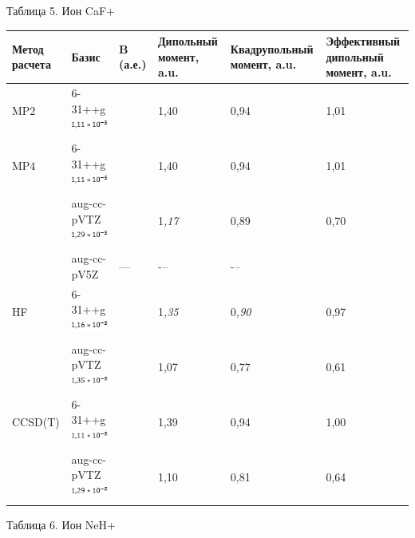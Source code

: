 \documentclass{article}
\begin{document}
\vspace{10pt}
\begin{center}
Таблица 5. Ион CaF+

\vspace{10pt}
\begin{tabular}{|>{\raggedright}p{31pt}|>{\raggedright}p{45pt}|>{\raggedright}p{40pt}|>{\raggedright}p{39pt}|>{\raggedright}p{52pt}|>{\raggedright}p{62pt}|}
\hline
М\textbf{етод расчета} & Б\textbf{азис} & B\textbf{ (а.е.)} & Д\textbf{ипольный 
момент, a.u.} & К\textbf{вадрупольный момент, a.u.} & Э\textbf{ффективный 
дипольный момент, a.u.}\tabularnewline
\hline
MP2 & 6-31++g
\includegraphics[width=54pt, height=15pt, keepaspectratio=true]{7-fig013.png}
 &  & 1,40 & 0,94 & 1,01\tabularnewline
\hline
MP4 & 6-31++g
\includegraphics[width=54pt, height=15pt, keepaspectratio=true]{7-fig014.png}
 &  & 1,40 & 0,94 & 1,01\tabularnewline
\hline
 & aug-cc-pVTZ
\includegraphics[width=54pt, height=15pt, keepaspectratio=true]{7-fig015.png}
 &  & 1\textit{,17} & 0,89 & 0,70\tabularnewline
\hline
 & aug-cc-pV5Z & --- & -\textit{--} & -\textit{--} & \tabularnewline
\hline
HF & 6-31++g
\includegraphics[width=54pt, height=15pt, keepaspectratio=true]{7-fig016.png}
 &  & 1\textit{,35} & 0\textit{,90} & 0,97\tabularnewline
\hline
 & aug-cc-pVTZ
\includegraphics[width=54pt, height=15pt, keepaspectratio=true]{7-fig017.png}
 &  & 1,07 & 0,77 & 0,61\tabularnewline
\hline
CCSD(T) & 6-31++g
\includegraphics[width=54pt, height=15pt, keepaspectratio=true]{7-fig018.png}
 &  & 1,39 & 0,94 & 1,00\tabularnewline
\hline
 & aug-cc-pVTZ
\includegraphics[width=54pt, height=15pt, keepaspectratio=true]{7-fig019.png}
 &  & 1,10 & 0,81 & 0,64\tabularnewline
\hline
\end{tabular}

\vspace{10pt}
Таблица 6. Ион NeH+\label{HToc453749994}
\end{center}
\end{document}

